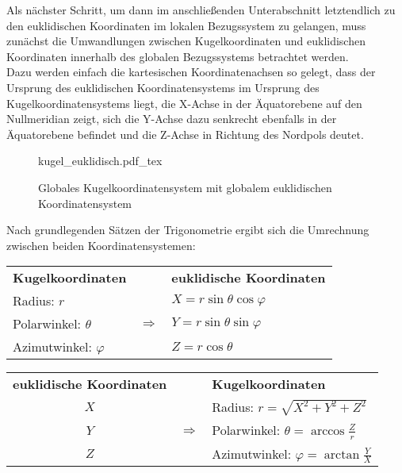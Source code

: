 Als nächster Schritt, um dann im anschließenden Unterabschnitt letztendlich zu den euklidischen Koordinaten im lokalen Bezugssystem zu gelangen, muss zunächst die Umwandlungen zwischen Kugelkoordinaten und euklidischen Koordinaten innerhalb des globalen Bezugssystems betrachtet werden.\\
Dazu werden einfach die kartesischen Koordinatenachsen so gelegt, dass der Ursprung des euklidischen Koordinatensystems im Ursprung des Kugelkoordinatensystems liegt, die X-Achse in der Äquatorebene auf den Nullmeridian zeigt, sich die Y-Achse dazu senkrecht ebenfalls in der Äquatorebene befindet und die Z-Achse in Richtung des Nordpols deutet.

\begin{figure}[H]
	\centering
	\def\svgwidth{9.5cm}
	{kugel_euklidisch.pdf_tex}
	\caption{Globales Kugelkoordinatensystem mit globalem euklidischen Koordinatensystem}
	\label{fig:kugel_euklidisch}
\end{figure}

Nach grundlegenden Sätzen der Trigonometrie ergibt sich die Umrechnung zwischen beiden Koordinatensystemen:

\begin{center}
	\begin{tabular}{l P{2cm} l}
		\textbf{Kugelkoordinaten} & & \textbf{euklidische Koordinaten}\\[0.2cm]
		Radius: $r$ && $X = r \sin\theta \cos\varphi$\\
		Polarwinkel: $\theta$ & $\Longrightarrow$ & $Y = r \sin\theta \sin\varphi$\\
		Azimutwinkel: $\varphi$ && $Z = r \cos\theta$\\
	\end{tabular}
\end{center}\kleinerabstand

\begin{center}
	\begin{tabular}{c P{2cm} l}
		\textbf{euklidische Koordinaten} & & \textbf{Kugelkoordinaten}\\[0.2cm]
		$X$  && Radius: $r = \sqrt{X^2+Y^2+Z^2}$ \\
		$Y$ & $\Longrightarrow$ & Polarwinkel: $\theta = \arccos\frac{Z}{r}$\\
		$Z$ && Azimutwinkel: $\varphi = \arctan\frac{Y}{X}$\\
	\end{tabular}
\end{center}

